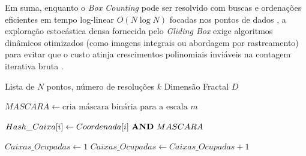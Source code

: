 \documentclass[12pt]{article}
\begin{document}
Em suma, enquanto o \textit{Box Counting} pode ser resolvido com buscas e ordenações eficientes em tempo log-linear $O(N \log N)$ focadas nos pontos de dados \cite{liebovitch1989}, a exploração estocástica densa fornecida pelo \textit{Gliding Box} exige algoritmos dinâmicos otimizados (como imagens integrais ou abordagem por rastreamento) para evitar que o custo atinja crescimentos polinomiais inviáveis na contagem iterativa bruta \cite{barna2024}.

\begin{algorithm}[htpb]
\caption{Box Counting Otimizado por Ordenação}
\label{alg:box_counting}
\begin{algorithmic}[1] %
    \Require Lista de $N$ pontos, número de resoluções $k$
    \Ensure Dimensão Fractal $D$
    
    \Statex %
        \State $MASCARA \gets \text{cria máscara binária para a escala } m$
        
            \State $Hash\_Caixa[i] \gets Coordenada[i] \text{ \textbf{AND} } MASCARA$
        \EndFor
        
        \State {} 
        
        \State $Caixas\_Ocupadas \gets 1$
                \State $Caixas\_Ocupadas \gets Caixas\_Ocupadas + 1$
            \EndIf
        \EndFor
        
        \State {}
    \EndFor
    \Statex
    \State \Return {}
\end{algorithmic}
\end{algorithm}
\end{document}

